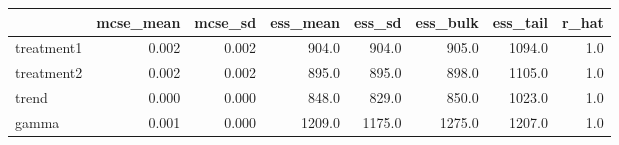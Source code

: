 \begin{tabular}{lrrrrrrr}
\toprule
{} &  mcse\_mean &  mcse\_sd &  ess\_mean &  ess\_sd &  ess\_bulk &  ess\_tail &  r\_hat \\
\midrule
treatment1 &      0.002 &    0.002 &     904.0 &   904.0 &     905.0 &    1094.0 &    1.0 \\
treatment2 &      0.002 &    0.002 &     895.0 &   895.0 &     898.0 &    1105.0 &    1.0 \\
trend      &      0.000 &    0.000 &     848.0 &   829.0 &     850.0 &    1023.0 &    1.0 \\
gamma      &      0.001 &    0.000 &    1209.0 &  1175.0 &    1275.0 &    1207.0 &    1.0 \\
\bottomrule
\end{tabular}
